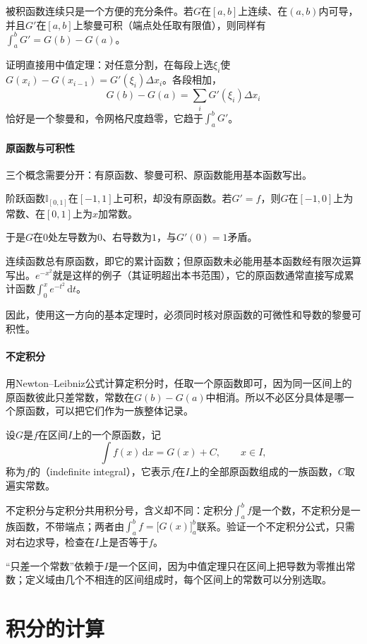 被积函数连续只是一个方便的充分条件。若$G$在$[a,b]$上连续、在$(a,b)$内可导，并且$G'$在$[a,b]$上黎曼可积（端点处任取有限值），则同样有$\int_a^bG'=G(b)-G(a)$。

证明直接用中值定理：对任意分割，在每段上选$\xi_i$使$G(x_i)-G(x_{i-1})=G'(\xi_i)\Delta x_i$。各段相加，
\[
 G(b)-G(a)=\sum_iG'(\xi_i)\Delta x_i
\]
恰好是一个黎曼和，令网格尺度趋零，它趋于$\int_a^bG'$。

\paragraph{原函数与可积性}
三个概念需要分开：有原函数、黎曼可积、原函数能用基本函数写出。
\begin{example}[可积而没有原函数的阶跃函数]
\label{ex:ru-step-no-antiderivative}
阶跃函数$\mathbb I_{[0,1]}$在$[-1,1]$上可积，却没有原函数。若$G'=f$，则$G$在$[-1,0]$上为常数、在$[0,1]$上为$x$加常数。

于是$G$在$0$处左导数为$0$、右导数为$1$，与$G'(0)=1$矛盾。
\end{example}
连续函数总有原函数，即它的累计函数；但原函数未必能用基本函数经有限次运算写出。$e^{-x^2}$就是这样的例子（其证明超出本书范围），它的原函数通常直接写成累计函数$\int_0^xe^{-t^2}\,\mathrm dt$。

因此，使用这一方向的基本定理时，必须同时核对原函数的可微性和导数的黎曼可积性。

\paragraph{不定积分}
用Newton--Leibniz公式计算定积分时，任取一个原函数即可，因为同一区间上的原函数彼此只差常数，常数在$G(b)-G(a)$中相消。所以不必区分具体是哪一个原函数，可以把它们作为一族整体记录。

设$G$是$f$在区间$I$上的一个原函数，记
\[
 \int f(x)\,\mathrm dx=G(x)+C,\qquad x\in I,
\]
称为$f$的（indefinite integral），它表示$f$在$I$上的全部原函数组成的一族函数，$C$取遍实常数。

不定积分与定积分共用积分号，含义却不同：定积分$\int_a^bf$是一个数，不定积分是一族函数，不带端点；两者由$\int_a^bf=\bigl[G(x)\bigr]_a^b$联系。验证一个不定积分公式，只需对右边求导，检查在$I$上是否等于$f$。

“只差一个常数”依赖于$I$是一个区间，因为中值定理只在区间上把导数为零推出常数；定义域由几个不相连的区间组成时，每个区间上的常数可以分别选取。
\section{积分的计算}
\label{sec:ru-integration-methods}

